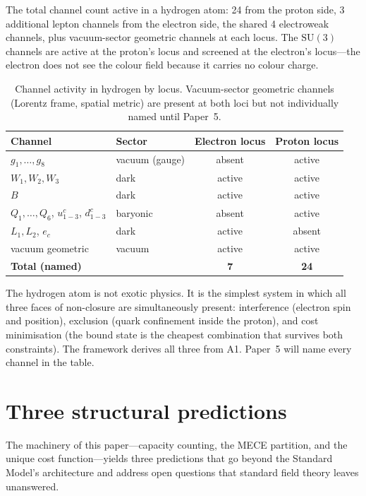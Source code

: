 \documentclass[11pt]{article}
\newcommand{\SU}{\mathrm{SU}}
\begin{document}
The total channel count active in a hydrogen atom: 24 from the proton
side, 3 additional lepton channels from the electron side, the shared 4
electroweak channels, plus vacuum-sector geometric channels at each
locus.  The $\SU(3)$ channels are active at the proton's locus and
screened at the electron's locus---the electron does not see the colour
field because it carries no colour charge.

\begin{table}[h]
\centering\small
\begin{tabular}{llcc}
\toprule
\textbf{Channel} & \textbf{Sector} & \textbf{Electron locus} & \textbf{Proton locus} \\
\midrule
$g_1,\ldots,g_8$ & vacuum (gauge) & absent & active \\
$W_1, W_2, W_3$ & dark & active & active \\
$B$              & dark & active & active \\
$Q_1,\ldots,Q_6$, $u^c_{1-3}$, $d^c_{1-3}$ & baryonic & absent & active \\
$L_1, L_2$, $e_c$ & dark & active & absent \\
vacuum geometric & vacuum & active & active \\
\midrule
\textbf{Total (named)} & & \textbf{7} & \textbf{24} \\
\bottomrule
\end{tabular}
\caption{Channel activity in hydrogen by locus.  Vacuum-sector geometric
channels (Lorentz frame, spatial metric) are present at both loci but not
individually named until Paper~5.}
\end{table}

The hydrogen atom is not exotic physics.  It is the simplest system in
which all three faces of non-closure are simultaneously present:
interference (electron spin and position), exclusion (quark confinement
inside the proton), and cost minimisation (the bound state is the cheapest
combination that survives both constraints).  The framework derives all
three from A1.  Paper~5 will name every channel in the table.


\section{Three structural predictions}
\label{sec:predictions}

The machinery of this paper---capacity counting, the MECE partition, and the unique cost function---yields three predictions that go beyond the Standard Model's architecture and address open questions that standard field theory leaves unanswered.
\end{document}
